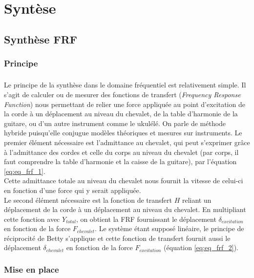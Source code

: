 \chapter{Syntèse}
\section{Synthèse FRF}

\subsection{Principe}
\paragraph*{} 

Le principe de la synthèse dans le domaine fréquentiel est relativement simple.
Il s'agit de calculer ou de mesurer des fonctions de transfert
(\textit{Frequency Response Function}) nous permettant de relier une force
appliquée au point d'excitation de la corde à un déplacement au niveau du
chevalet, de la table d'harmonie de la guitare, ou d'un autre instrument comme le ukulélé. On parle de méthode hybride puisqu'elle conjugue modèles théoriques et mesures sur instruments. Le premier élément nécessaire est l'admittance au chevalet, qui peut s'exprimer grâce à l'admittance des cordes et celle du corps au niveau du chevalet (par corps, il faut comprendre la table d'harmonie et la caisse de la guitare), par l'équation \ref{eq:eq_frf_1}.\\

Cette admittance totale au niveau du chevalet nous fournit la vitesse de
celui-ci en fonction d'une force qui y serait appliquée. \\

Le second élément nécessaire est la fonction de transfert $H$ reliant un
déplacement de la corde à un déplacement au niveau du chevalet. En multipliant cette fonction avec $Y_{total}$, on obtient la FRF fournissant le déplacement $\delta_{excitation}$ en fonction de la force $F_{chevalet}$. Le système étant supposé linéaire, le principe de réciprocité de Betty s'applique et cette fonction de transfert fournit aussi le déplacement $\delta_{chevalet}$ en fonction de la force $F_{excitation}$ (équation \ref{eq:eq_frf_2}).


\subsection{Mise en place}
